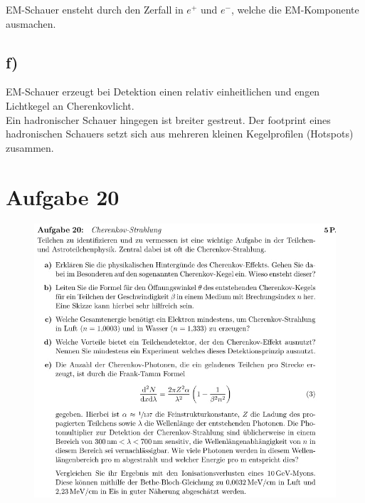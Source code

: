     \justifying EM-Schauer ensteht durch den Zerfall in $e^+$ und $e^-$, welche die EM-Komponente ausmachen. 
    

\subsection{f)}

    \justifying EM-Schauer erzeugt bei Detektion einen relativ einheitlichen und engen Lichtkegel an Cherenkovlicht.\\
    Ein hadronischer Schauer hingegen ist breiter gestreut. Der footprint eines hadronischen Schauers setzt sich aus mehreren kleinen Kegelprofilen (Hotspots) zusammen.  


\section{Aufgabe 20}

    \begin{figure}[H]
        \centering
        \includegraphics[width=\textwidth]{images/Aufgabe20.jpg}
        \label{fig:3}
    \end{figure}


